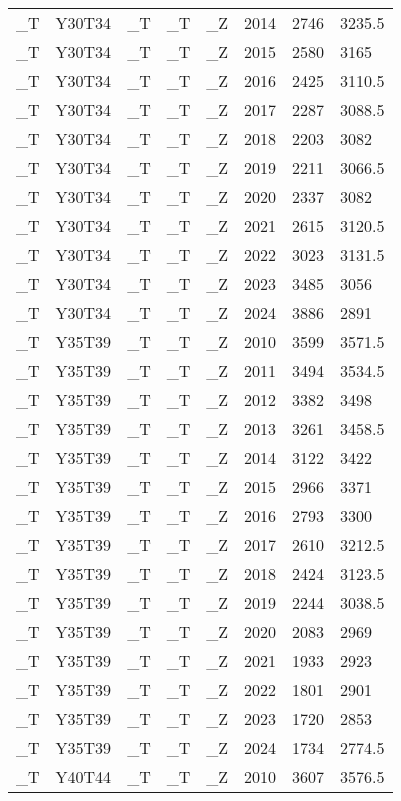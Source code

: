\begin{longtable}[t]{llllllll}
\_T & Y30T34 & \_T & \_T & \_Z & 2014 & 2746 & 3235.5\\
\addlinespace
\_T & Y30T34 & \_T & \_T & \_Z & 2015 & 2580 & 3165\\
\_T & Y30T34 & \_T & \_T & \_Z & 2016 & 2425 & 3110.5\\
\_T & Y30T34 & \_T & \_T & \_Z & 2017 & 2287 & 3088.5\\
\_T & Y30T34 & \_T & \_T & \_Z & 2018 & 2203 & 3082\\
\_T & Y30T34 & \_T & \_T & \_Z & 2019 & 2211 & 3066.5\\
\addlinespace
\_T & Y30T34 & \_T & \_T & \_Z & 2020 & 2337 & 3082\\
\_T & Y30T34 & \_T & \_T & \_Z & 2021 & 2615 & 3120.5\\
\_T & Y30T34 & \_T & \_T & \_Z & 2022 & 3023 & 3131.5\\
\_T & Y30T34 & \_T & \_T & \_Z & 2023 & 3485 & 3056\\
\_T & Y30T34 & \_T & \_T & \_Z & 2024 & 3886 & 2891\\
\addlinespace
\_T & Y35T39 & \_T & \_T & \_Z & 2010 & 3599 & 3571.5\\
\_T & Y35T39 & \_T & \_T & \_Z & 2011 & 3494 & 3534.5\\
\_T & Y35T39 & \_T & \_T & \_Z & 2012 & 3382 & 3498\\
\_T & Y35T39 & \_T & \_T & \_Z & 2013 & 3261 & 3458.5\\
\_T & Y35T39 & \_T & \_T & \_Z & 2014 & 3122 & 3422\\
\addlinespace
\_T & Y35T39 & \_T & \_T & \_Z & 2015 & 2966 & 3371\\
\_T & Y35T39 & \_T & \_T & \_Z & 2016 & 2793 & 3300\\
\_T & Y35T39 & \_T & \_T & \_Z & 2017 & 2610 & 3212.5\\
\_T & Y35T39 & \_T & \_T & \_Z & 2018 & 2424 & 3123.5\\
\_T & Y35T39 & \_T & \_T & \_Z & 2019 & 2244 & 3038.5\\
\addlinespace
\_T & Y35T39 & \_T & \_T & \_Z & 2020 & 2083 & 2969\\
\_T & Y35T39 & \_T & \_T & \_Z & 2021 & 1933 & 2923\\
\_T & Y35T39 & \_T & \_T & \_Z & 2022 & 1801 & 2901\\
\_T & Y35T39 & \_T & \_T & \_Z & 2023 & 1720 & 2853\\
\_T & Y35T39 & \_T & \_T & \_Z & 2024 & 1734 & 2774.5\\
\addlinespace
\_T & Y40T44 & \_T & \_T & \_Z & 2010 & 3607 & 3576.5\\

\end{longtable}

